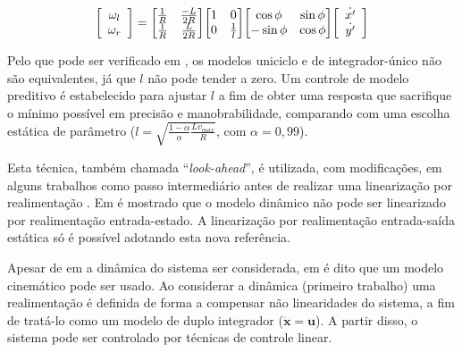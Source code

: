 \begin{equation}
	\label{eq:si_inv_diff}
	\mleft[ 
	\begin{array}{c c}
	\omega_l \\ \omega_r
	\end{array}
	\mright] = \mleft[
	\begin{matrix}
		  \frac{1}{R} & \frac{-L}{2R} \\
		  \frac{1}{R} & \frac{L}{2R} \\
	\end{matrix}
	\mright] \mleft[
	\begin{matrix}
		  1 & 0 \\
		  0 & \frac{1}{l} \\
	\end{matrix}
	\mright] \mleft[
	\begin{matrix}
		  \cos{\phi} & \sin{\phi} \\
		  -\sin{\phi} & \cos{\phi} \\
	\end{matrix}
	\mright] \mleft[ 
	\begin{array}{c c}
	\dot{x'} \\ \dot{y'}
	\end{array}
	\mright]
\end{equation}

Pelo que pode ser verificado em , os modelos
uniciclo e de integrador-único não são equivalentes, já que $l$ não pode tender
a zero. Um controle de modelo preditivo é estabelecido para ajustar $l$ a fim de
obter uma resposta que sacrifique o mínimo possível em precisão e
manobrabilidade, comparando com uma escolha estática de parâmetro ($l =
\sqrt{\frac{1-\alpha}{\alpha}\frac{Lv_{max}}{R}}$, com $\alpha = 0,99$). 

Esta técnica, também chamada ``\textit{look-ahead}'', é utilizada, com
modificações, em alguns trabalhos como passo intermediário antes de realizar uma
linearização por realimentação \cite{art:feedlin_lookahead, art:novel}. Em
 é mostrado que o modelo dinâmico não pode ser
linearizado por realimentação entrada-estado. A linearização por realimentação
entrada-saída estática só é possível adotando esta nova referência.

Apesar de em  a dinâmica do sistema ser
considerada, em  é dito que um modelo cinemático pode ser
usado. Ao considerar a dinâmica (primeiro trabalho) uma realimentação é
definida de forma a compensar não linearidades do sistema, a fim de tratá-lo
como um modelo de duplo integrador ($\mathbf{\ddot{x}} = \mathbf{u}$). A partir
disso, o sistema pode ser controlado por técnicas de controle linear. 

